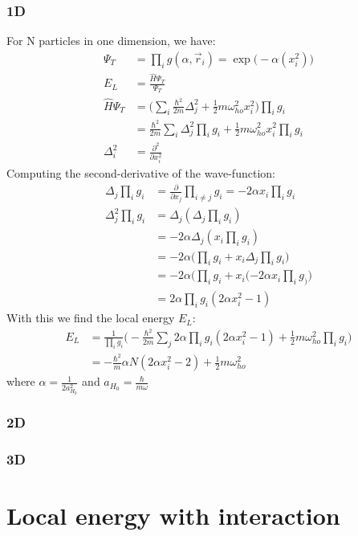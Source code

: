 \documentclass[12pt]{article}
\newcommand{\f}[2]{\frac{#1}{#2}}
\newcommand{\op}[1]{\widehat{#1}}
\newcommand{\pp}[1]{\frac{\partial}{\partial #1}}
\newcommand{\ppn}[1]{\frac{\partial^2}{\partial #1^2}}
\begin{document}
\subsubsection{1D}
For N particles in one dimension, we have:
\begin{align*}
	\Psi_T &= \prod_{i} g(\alpha, \vec{r}_i) = \exp\big(-\alpha(x^{2}_i)\big) \\
	E_L &= \f{\op{H}\Psi_T}{\Psi_T} \\
	\op{H}\Psi_T &= \big(\sum_{i} \f{\hbar^2}{2m}\Delta^{2}_j + 
	\f{1}{2}m\omega^{2}_{ho}x^{2}_i \big) \prod_{i} g_i \\
	&= \f{\hbar^2}{2m}\sum_{i} \Delta^{2}_j \prod_{i} g_i + 
	\f{1}{2}m\omega^{2}_{ho}x^{2}_i \prod_{i} g_i \\
	\Delta^{2}_i &= \ppn{x_i}
\end{align*}
Computing the second-derivative of the wave-function:
\begin{align*}
	\Delta_j \prod_{i}g_i &=\pp{x_j}\prod_{i\neq j}g_i = -2\alpha x_i\prod_{i} g_i \\
	\Delta^{2}_j\prod_{i}g_i &= \Delta_j(\Delta_j \prod_{i}g_i) \\
	&= -2\alpha \Delta_j(x_i\prod_{i} g_i) \\
	&= -2\alpha \big(\prod_{i}g_i + x_i\Delta_j\prod_{i}g_i \big) \\
	&= -2\alpha \big(\prod_{i}g_i + x_i(-2\alpha x_i \prod_{i}g_)\big) \\
	&= 2\alpha\prod_{i}g_i(2\alpha x^{2}_i - 1)
\end{align*}
With this we find the local energy $E_L$:
\begin{align*}
	E_L &= 
	\f{1}{\prod_{i}g_i}\big(-\f{\hbar^2}{2m}\sum_{j}2\alpha\prod_{i}g_i
	(2\alpha x^{2}_i - 1) + \f{1}{2}m\omega^{2}_{ho}\prod_{i}g_i \big) \\
	&= -\f{\hbar^2}{m}\alpha N(2\alpha x^{2}_i - 2) + \f{1}{2}m\omega^{2}_{ho}
\end{align*}
where $\alpha = \f{1}{2a^{2}_{H_0}}$ and $a_{H_0} = \f{\hbar}{m\omega}$

\subsubsection{2D}
\subsubsection{3D}
\section{Local energy with interaction}
\end{document}
